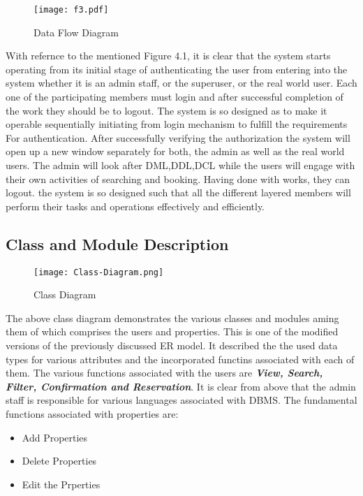 \documentclass[12pt]{report}
\begin{document}
\begin{figure}[!htb]
\texttt{[image: f3.pdf]}
\centering
\caption{Data Flow Diagram}
\end{figure}
With refernce to the mentioned Figure 4.1, it is clear that the system starts operating from its initial stage of authenticating the user from entering into the system whether it is an admin staff, or the superuser, or the real world user. Each one of the participating members must login and after successful completion of the work they should be to logout.\newline
The system is so designed as to make it
operable sequentially initiating from
login mechanism to fulfill the requirements
For authentication.
After successfully verifying the authorization
the system will open up a new window
separately for both, the admin as well as the
real world users.
The admin will look after DML,DDL,DCL
while the users will engage with their own
activities of searching and booking. Having
done with works, they can logout. the system is so designed such that all the different layered members will perform their tasks and operations effectively and efficiently.  \newline




\subsection{Class and Module Description}

\begin{figure}[!htb]
\texttt{[image: Class-Diagram.png]}
\centering
\caption{Class Diagram}
\end{figure}
The above class diagram demonstrates the various classes and modules aming them of which comprises the users and properties. This is one of the modified versions of the previously discussed ER model. It described the the used data types for various attributes and the incorporated functins associated with each of them. The various functions associated with the users are \textbf{\textit{View, Search, Filter, Confirmation and Reservation}}. It is clear from above that the admin staff is responsible for various languages associated with DBMS. The fundamental functions associated with properties are:
\begin{itemize}
\item Add Properties
\item Delete Properties
\item Edit the Prperties
\end{itemize}  
\end{document}
